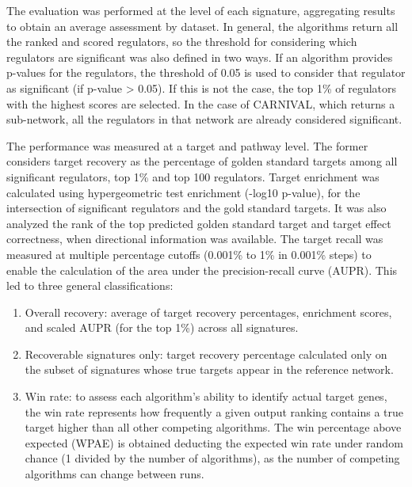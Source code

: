 The evaluation was performed at the level of each signature, aggregating results to obtain an average assessment by dataset. In general, the algorithms return all the ranked and scored regulators, so the threshold for considering which regulators are significant was also defined in two ways. If an algorithm provides p-values for the regulators, the threshold of 0.05 is used to consider that regulator as significant (if p-value > 0.05). If this is not the case, the top 1\% of regulators with the highest scores are selected. In the case of CARNIVAL, which returns a sub-network, all the regulators in that network are already considered significant.

The performance was measured at a target and pathway level. The former considers target recovery as the percentage of golden standard targets among all significant regulators, top 1\% and top 100 regulators. Target enrichment was calculated using hypergeometric test enrichment (-log10 p-value), for the intersection of significant regulators and the gold standard targets. It was also analyzed the rank of the top predicted golden standard target and target effect correctness, when directional information was available. The target recall was measured at multiple percentage cutoffs (0.001\% to 1\% in 0.001\% steps) to enable the calculation of the area under the precision-recall curve (AUPR). This led to three general classifications:

\begin{enumerate}
\item Overall recovery: average of target recovery percentages, enrichment scores, and scaled AUPR (for the top 1\%) across all signatures.

\item Recoverable signatures only: target recovery percentage calculated only on the subset of signatures whose true targets appear in the reference network.

\item	Win rate: to assess each algorithm's ability to identify actual target genes, the win rate represents how frequently a given output ranking contains a true target higher than all other competing algorithms. The win percentage above expected (WPAE) is obtained deducting the expected win rate under random chance (1 divided by the number of algorithms), as the number of competing algorithms can change between runs. 
\end{enumerate}

